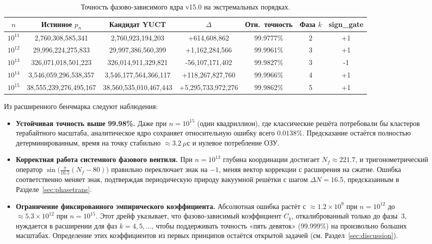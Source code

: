 \documentclass[12pt,a4paper]{article}
\begin{document}
	\begin{table}[htbp]
		\centering
		\caption{Точность фазово-зависимого ядра v15.0 на экстремальных порядках.}
		\label{tab:benchmark-extreme}
		\begin{tabular}{c c c c c c c}
			\toprule
			\(n\) & Истинное \(p_n\) & Кандидат YUCT & \(\Delta\) & Отн.\ точность & Фаза \(k\) & sign\_gate \\
			\midrule
			\(10^{11}\) & 2,760,308,585,341 & 2,760,923,194,203 & +614,608,862   & 99.9777\% & 2 & +1 \\
			\(10^{12}\) & 29,996,224,275,833 & 29,997,386,560,399 & +1,162,284,566 & 99.9961\% & 3 & +1 \\
			\(10^{13}\) & 326,071,018,501,223 & 326,014,911,329,821 & -56,107,171,402 & 99.9827\% & 3 & -1 \\
			\(10^{14}\) & 3,546,059,296,538,357 & 3,546,177,564,366,117 & +118,267,827,760 & 99.9966\% & 4 & +1 \\
			\(10^{15}\) & 38,555,239,276,495,167 & 38,560,535,010,467,443 & +5,295,733,972,276 & 99.9862\% & 5 & +1 \\
			\bottomrule
		\end{tabular}
	\end{table}
	
	Из расширенного бенчмарка следуют наблюдения:
	
	\begin{itemize}
		\item \textbf{Устойчивая точность выше 99.98\%.}
		Даже при \(n = 10^{15}\) (один квадриллион), где классические решёта
		потребовали бы кластеров терабайтного масштаба, аналитическое ядро
		сохраняет относительную ошибку всего \(0.0138\%\). Предсказание остаётся
		полностью детерминированным, время на точку стабильно \(\approx 3.2\ \mu\text{с}\)
		и нулевое потребление ОЗУ.
		
		\item \textbf{Корректная работа системного фазового вентиля.}
		При \(n = 10^{13}\) глубина координации достигает \(N_f \approx 221.7\),
		и тригонометрический оператор \(\sin\!\bigl(\frac{\pi}{16.5}(N_f-80)\bigr)\)
		правильно переключает знак на \(-1\), меняя вектор коррекции с расширения
		на сжатие. Ошибка соответственно меняет знак, подтверждая периодическую
		природу вакуумной решётки с шагом \(\Delta N = 16.5\), предсказанным
		в Разделе~\ref{sec:phasetrans}.
		
		\item \textbf{Ограничение фиксированного эмпирического коэффициента.}
		Абсолютная ошибка растёт с \(\approx 1.2\times 10^{9}\) при
		\(n = 10^{12}\) до \(\approx 5.3\times 10^{12}\) при
		\(n = 10^{15}\). Этот дрейф указывает, что фазово-зависимый коэффициент
		\(C_k\), откалиброванный только до фазы~3, нуждается в расширении для
		фаз \(k = 4, 5, \dots\), чтобы поддерживать точность «пять девяток»
		(99.999\%) на произвольно больших масштабах. Определение этих
		коэффициентов из первых принципов остаётся открытой задачей
		(см. Раздел~\ref{sec:discussion}).
	\end{itemize}
	
\end{document}
